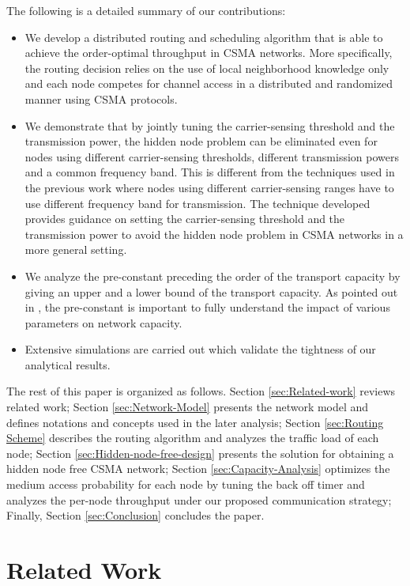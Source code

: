 \documentclass[english]{IEEEtran}
\theoremstyle{plain}
\theoremstyle{plain}
\theoremstyle{plain}
\theoremstyle{remark}
\begin{document}
The following is a detailed summary of our contributions:
\begin{itemize}
\item We develop a distributed routing and scheduling algorithm that is
able to achieve the order-optimal throughput in CSMA networks. More
specifically, the routing decision relies on the use of local neighborhood
knowledge only and each node competes for channel access in a distributed
and randomized manner using CSMA protocols.
\item We demonstrate that by jointly tuning the carrier-sensing threshold
and the transmission power, the hidden node problem can be eliminated
even for nodes using different carrier-sensing thresholds, different
transmission powers and a common frequency band. This is different
from the techniques used in the previous work \cite{Chau11Capacity}
where nodes using different carrier-sensing ranges have to use different
frequency band for transmission. The technique developed provides
guidance on setting the carrier-sensing threshold and the transmission
power to avoid the hidden node problem in CSMA networks in a more
general setting.
\item We analyze the pre-constant preceding the order of the transport capacity
by giving an upper and a lower bound of the transport capacity. As
pointed out in \cite{Haenggi09Stochastic}, the pre-constant is important
to fully understand the impact of various parameters on network capacity.
\item Extensive simulations are carried out which validate the tightness
of our analytical results.
\end{itemize}
The rest of this paper is organized as follows. Section \ref{sec:Related-work}
reviews related work; Section \ref{sec:Network-Model} presents the
network model and defines notations and concepts used in the later
analysis; Section \ref{sec:Routing Scheme} describes the routing
algorithm and analyzes the traffic load of each node; Section \ref{sec:Hidden-node-free-design}
presents the solution for obtaining a hidden node free CSMA network;
Section \ref{sec:Capacity-Analysis} optimizes the medium access probability
for each node by tuning the back off timer and analyzes the per-node
throughput under our proposed communication strategy; Finally, Section
\ref{sec:Conclusion} concludes the paper.


\section{Related Work\label{sec:Related-work}}
\end{document}
